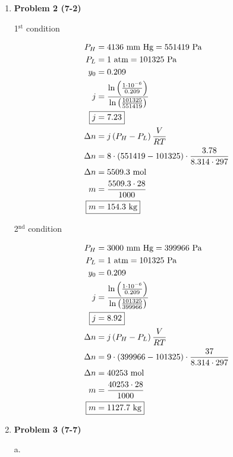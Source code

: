 \documentclass[12pt]{article}
\begin{document}
\begin{enumerate}
    \newpage
    \item \textbf{Problem 2 (7-2)}
    
    1$^{\text{st}}$ condition

    \begin{align*}
        P_H &= 4136 \text{ mm Hg} = 551419 \text{ Pa} \\
        P_L &= 1 \text{ atm} = 101325 \text{ Pa} \\
        y_0 &= 0.209 \\
        j &= \frac{\ln\left(\frac{1\cdot10^{-6}}{0.209}\right)}{\ln\left(\frac{101325}{551419}\right)} \\
        \Aboxed{j &= 7.23} \\
        \Delta n &= j \left(P_H - P_L\right) \frac{V}{RT} \\
        \Delta n &= 8 \cdot \left(551419 - 101325\right)  \cdot \frac{3.78}{8.314 \cdot 297} \\
        \Delta n &= 5509.3 \text{ mol} \\
        m &= \frac{5509.3 \cdot 28}{1000} \\
        \Aboxed{m &= 154.3 \text{ kg}}
    \end{align*}

    2$^{\text{nd}}$ condition

    \begin{align*}
        P_H &= 3000 \text{ mm Hg} = 399966 \text{ Pa} \\
        P_L &= 1 \text{ atm} = 101325 \text{ Pa} \\
        y_0 &= 0.209 \\
        j &= \frac{\ln\left(\frac{1\cdot10^{-6}}{0.209}\right)}{\ln\left(\frac{101325}{399966}\right)} \\
        \Aboxed{j &= 8.92} \\
        \Delta n &= j \left(P_H - P_L\right) \frac{V}{RT} \\
        \Delta n &= 9 \cdot \left(399966 - 101325\right)  \cdot \frac{37}{8.314 \cdot 297} \\
        \Delta n &= 40253 \text{ mol} \\
        m &= \frac{40253 \cdot 28}{1000} \\
        \Aboxed{m &= 1127.7 \text{ kg}}
    \end{align*}
    
    \newpage
    \item \textbf{Problem 3 (7-7)}
    
    a.


\end{enumerate}
\end{document}
